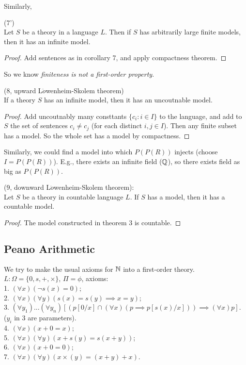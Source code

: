 \documentclass[a4paper]{article}
\begin{document}
Similarly,
\begin{coro} (7')\\
Let $S$ be a theory in a language $L$. Then if $S$ has arbitrarily large finite models, then it has an infinite model.
\begin{proof}
Add sentences as in corollary 7, and apply compactness theorem.
\end{proof}
\end{coro}

So we know \emph{finiteness is not a first-order property}.

\begin{coro} (8, upward L$\ddot{o}$wenheim-Skolem theorem)\\
If a theory $S$ has an infinite model, then it has an uncoutnable model.
\begin{proof}
Add uncoutnably many consttants $\{c_i:i \in I\}$ to the language, and add to $S$ the set of sentences $c_i \neq c_j$ (for each distinct $i,j \in I$). Then any finite subset has a model. So the whole set has a model by compactness.
\end{proof}
\end{coro}

Similarly, we could find a model into which $P(P(R))$ injects (choose $I = P(P(R))$). E.g., there exists an infinite field ($\mathbb{Q}$), so there exists field as big as $P(P(R))$.

\begin{coro} (9, downward L$\ddot{o}$wenheim-Skolem theorem):\\
Let $S$ be a theory in countable language $L$. If $S$ has a model, then it has a countable model.
\begin{proof}
The model constructed in theorem 3 is countable.
\end{proof}
\end{coro}

\subsection{Peano Arithmetic}
We try to make the usual axioms for $\mathbb{N}$ into a first-order theory.\\
$L : \Omega = \{0,s,+,\times\}$, $\Pi = \phi$, axioms:\\
1. $(\forall x) (\neg s(x) = 0)$;\\
2. $(\forall x)(\forall y) (s(x) = s(y) \implies x=y)$;\\
3. $(\forall y_1)...(\forall y_n) [(p[0/x] \cap (\forall x) (p \implies p[s(x)/x])) \implies (\forall x) p]$.\\
($y_i$ in 3 are parameters).\\
4. $(\forall x) (x+0=x)$;\\
5. $(\forall x)(\forall y) (x+s(y) = s(x+y))$;\\
6. $(\forall x) (x+0=0)$;\\
7. $(\forall x)(\forall y) (x\times(y) = (x+y)+x)$.
\end{document}
